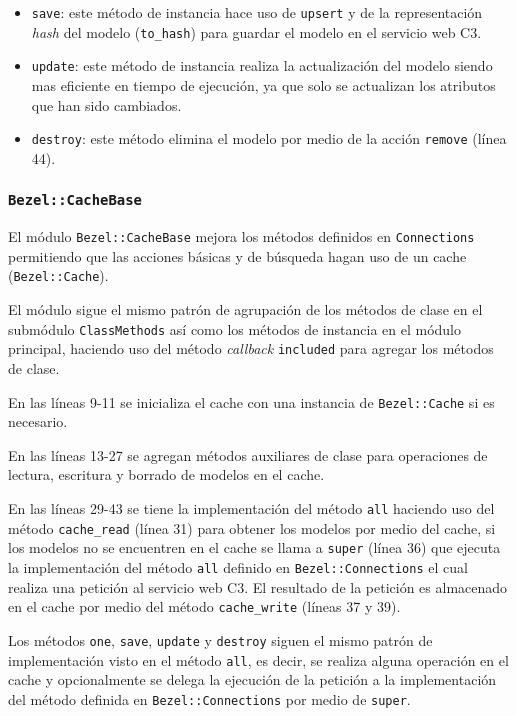 \begin{itemize}
\item \texttt{save}: este método de instancia hace uso de \texttt{upsert}
  y de la representación \textit{hash} del modelo (\texttt{to\_hash}) para
  guardar el modelo en el servicio web C3.
\item \texttt{update}: este método de instancia realiza la actualización del modelo
  siendo mas eficiente en tiempo de ejecución, ya que solo se actualizan
  los atributos que han sido cambiados.
\item \texttt{destroy}: este método elimina el modelo por medio de la acción
  \texttt{remove} (línea 44).
\end{itemize}

\subsubsection{\texttt{Bezel::CacheBase}}

El módulo \texttt{Bezel::CacheBase} mejora los métodos definidos en
\texttt{Connections} permitiendo que las acciones básicas y de búsqueda hagan uso
de un cache (\texttt{Bezel::Cache}).

El módulo sigue el mismo patrón de agrupación de los métodos de clase en el submódulo
\texttt{ClassMethods} así como los métodos de instancia en el módulo principal,
haciendo uso del método \textit{callback} \texttt{included} para agregar los métodos
de clase.



En las líneas 9-11 se inicializa el cache con una instancia de \texttt{Bezel::Cache}
si es necesario.

En las líneas 13-27 se agregan métodos auxiliares de clase para operaciones de lectura, escritura y borrado de modelos en el cache.

En las líneas 29-43 se tiene la implementación del método \texttt{all} haciendo
uso del método \texttt{cache\_read} (línea 31) para obtener los modelos por medio
del cache, si los modelos no se encuentren en el cache se llama a \texttt{super}
(línea 36) que ejecuta la implementación del método \texttt{all} definido en
\texttt{Bezel::Connections} el cual realiza una petición al servicio web C3.
El resultado de la petición es almacenado en el cache por medio del método
\texttt{cache\_write} (líneas 37 y 39).

Los métodos \texttt{one}, \texttt{save}, \texttt{update} y \texttt{destroy} siguen
el mismo patrón de implementación visto en el método \texttt{all}, es decir,
se realiza alguna operación en el cache y opcionalmente se delega la ejecución
de la petición a la implementación del método definida en \texttt{Bezel::Connections}
por medio de \texttt{super}.

